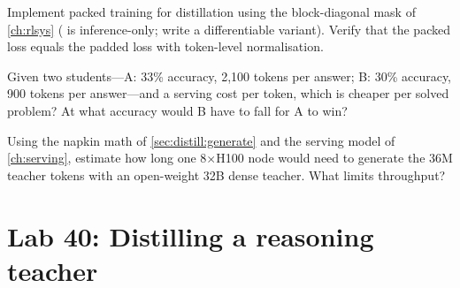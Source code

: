 \begin{exercise}
Implement packed training for distillation using the block-diagonal mask of \cref{ch:rlsys}
( is inference-only; write a differentiable variant). Verify that the packed
loss equals the padded loss with token-level normalisation.
\end{exercise}

\begin{exercise}
Given two students---A: 33\% accuracy, 2{,}100 tokens per answer; B: 30\% accuracy, 900 tokens per
answer---and a serving cost per token, which is cheaper per solved problem? At what accuracy would
B have to fall for A to win?
\end{exercise}

\begin{exercise}
Using the napkin math of \cref{sec:distill:generate} and the serving model of \cref{ch:serving},
estimate how long one 8$\times$H100 node would need to generate the 36M teacher tokens with an
open-weight 32B dense teacher. What limits throughput?
\end{exercise}

\section{Lab 40: Distilling a reasoning teacher}\label{sec:distill:lab}

